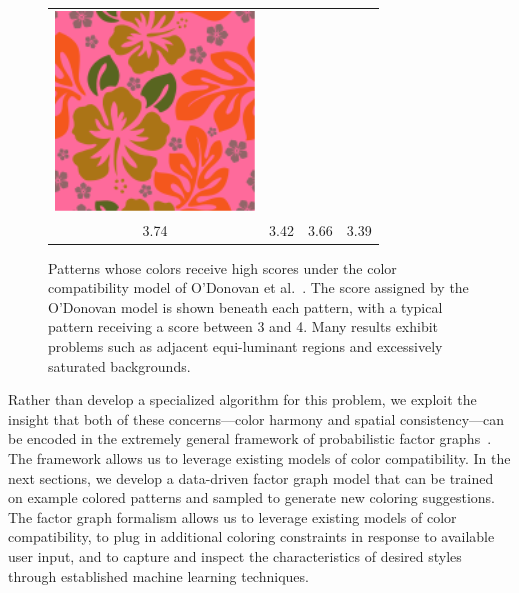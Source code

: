 \begin{figure}[htb]
\begin{tabular}{cccc}
\includegraphics[width=.2\columnwidth]{figs/colorCompat/r_1_3_3-39}\\
3.74&3.42&3.66&3.39\\
\end{tabular}
\caption{Patterns whose colors receive high scores under the color compatibility model of O'Donovan et al.~. The score assigned by the O'Donovan model is shown beneath each pattern, with a typical pattern receiving a score between 3 and 4. Many results exhibit problems such as adjacent equi-luminant regions and excessively saturated backgrounds.}
\label{fig:ColorCompatOnly}
\end{figure}

Rather than develop a specialized algorithm for this problem, we exploit the insight that both of these concerns---color harmony and spatial consistency---can be encoded in the extremely general framework of probabilistic factor graphs~\cite{FactorGraphs}. The framework allows us to leverage existing models of color compatibility. In the next sections, we develop a data-driven factor graph model that can be trained on example colored patterns and sampled to generate new coloring suggestions. The factor graph formalism allows us to leverage existing models of color compatibility, to plug in additional coloring constraints in response to available user input, and to capture and inspect the characteristics of desired styles through established machine learning techniques.
